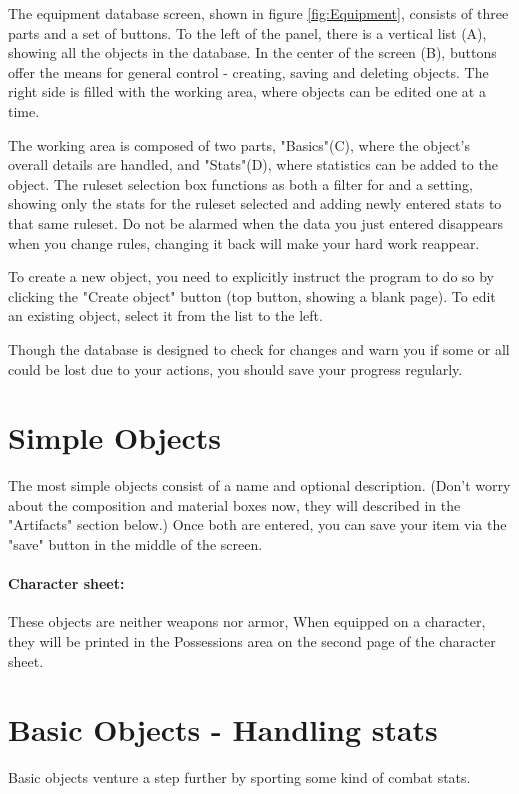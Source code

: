 The equipment database screen, shown in figure \ref{fig:Equipment}, consists of three parts and a set of buttons. To the left of the panel, there is a vertical list (A), showing all the objects in the database. In the center of the screen (B), buttons offer the means for general control - creating, saving and deleting objects. The right side is filled with the working area, where objects can be edited one at a time.

The working area is composed of two parts, "Basics"(C), where the object's overall details are handled, and "Stats"(D), where statistics can be added to the object. The ruleset selection box functions as both a filter for and a setting, showing only the stats for the ruleset selected and adding newly entered stats to that same ruleset. Do not be alarmed when the data you just entered disappears when you change rules, changing it back will make your hard work reappear.

To create a new object, you need to explicitly instruct the program to do so by clicking the "Create object" button (top button, showing a blank page). To edit an existing object, select it from the list to the left. 

Though the database is designed to check for changes and warn you if some or all could be lost due to your actions, you should save your progress regularly.

\section{Simple Objects}
The most simple objects consist of a name and optional description. (Don't worry about the composition and material boxes now, they will described in the "Artifacts" section below.) Once both are entered, you can save your item via the "save" button in the middle of the screen.

\paragraph{Character sheet:} These objects are neither weapons nor armor, When equipped on a character, they will be printed in the Possessions area on the second page of the character sheet.

\section{Basic Objects - Handling stats}
Basic objects venture a step further by sporting some kind of combat stats. 

